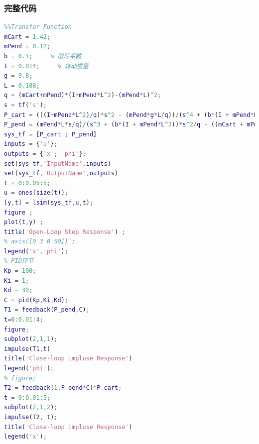 \documentclass{article}
\begin{document}
\subsubsection*{完整代码}
\begin{lstlisting}[language=matlab,numbers=none]
%Modeling
%%Transfer Function
mCart = 1.42;  
mPend = 0.12;
b = 0.1;     % 阻尼系数
I = 0.014;     % 转动惯量
g = 9.8;
L = 0.188;
q = (mCart+mPend)*(I+mPend*L^2)-(mPend*L)^2;
s = tf('s');
P_cart = (((I+mPend*L^2)/q)*s^2 - (mPend*g*L/q))/(s^4 + (b*(I + mPend*L^2))*s^3/q - ((mCart + mPend)*mPend*g*L)*s^2/q - b*mPend*g*L*s/q);
P_pend = (mPend*L*s/q)/(s^3 + (b*(I + mPend*L^2))*s^2/q - ((mCart + mPend)*mPend*g*L)*s/q - b*mPend*g*L/q);
sys_tf = [P_cart ; P_pend]
inputs = {'u'};
outputs = {'x'; 'phi'};
set(sys_tf,'InputName',inputs)
set(sys_tf,'OutputName',outputs)
t = 0:0.05:5;
u = ones(size(t));
[y,t] = lsim(sys_tf,u,t);
figure ;
plot(t,y) ;
title('Open-Loop Step Response') ;
% axis([0 3 0 50]) ;
legend('x','phi');
% PID环节
Kp = 100;
Ki = 1;
Kd = 30;
C = pid(Kp,Ki,Kd);
T1 = feedback(P_pend,C);
t=0:0.01:4;
figure;
subplot(2,1,1);
impulse(T1,t)
title('Close-loop impluse Response')
legend('phi');
% figure;
T2 = feedback(1,P_pend*C)*P_cart;
t = 0:0.01:5;
subplot(2,1,2);
impulse(T2, t);
title('Close-loop impluse Response')
legend('x');
\end{lstlisting}
\end{document}
